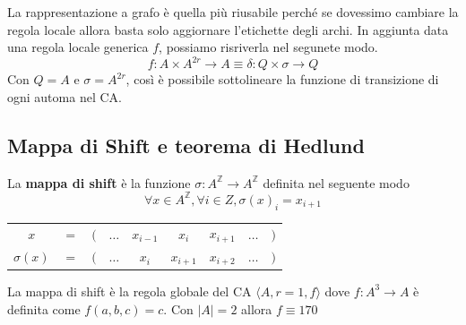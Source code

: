 La rappresentazione a grafo è quella più riusabile perché se dovessimo cambiare
la regola locale allora basta solo aggiornare l'etichette degli archi. In aggiunta
data una regola locale generica $f$, possiamo risriverla nel segunete modo.
\begin{equation}
    f: A\times A^{2r} \rightarrow A \equiv \delta: Q\times \sigma \rightarrow Q
\end{equation}
Con $Q= A$ e $\sigma = A^{2r} $, così è possibile sottolineare la funzione di transizione
di ogni automa nel CA.
\subsection{ Mappa di Shift e teorema di Hedlund}
\begin{definizione} 
    La \textbf{mappa di shift} è la funzione $\sigma:A^\mathbb{Z}\rightarrow A^\mathbb{Z}$
    definita nel seguente modo
    $$\forall x\in A^\mathbb{Z}, \forall i \in Z, \sigma(x)_i=x_{i+1}$$
    \begin{table}[!h]
        \centering
        \begin{tabular}{ccccccccc}
            $x$         & $=$ & $($ & $\dots$ & $x_{i-1}$ & $x_i$     & $x_{i+1}$ & $\dots$ & $)$ \\
            $\sigma(x)$ & $=$ & $($ & $\dots$ & $x_{i}$   & $x_{i+1}$ & $x_{i+2}$ & $\dots$ & $)$
        \end{tabular}
    \end{table}
\end{definizione}

\begin{nota}
    La mappa di shift è la regola globale del CA $\langle A,r=1,f\rangle$ dove
    $f:A^3\rightarrow A$ è definita come $f(a,b,c) = c$. Con $|A|=2$ allora $f\equiv 170$

\end{nota}

